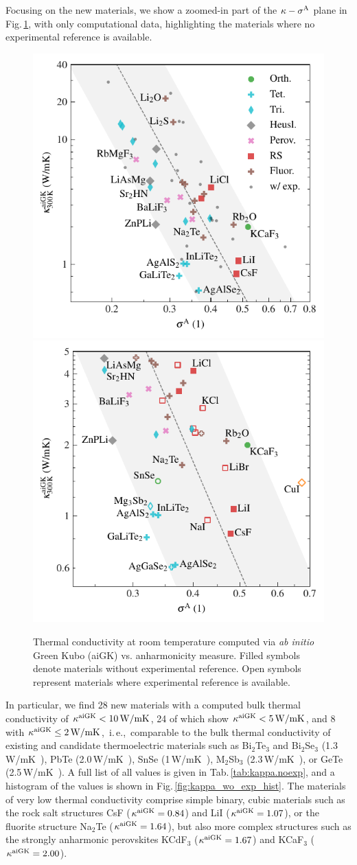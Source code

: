 Focusing on the new materials, we show a zoomed-in part of the $\kappa-\sigma^\mathrm{A}$ plane in Fig.\,\ref{fig:kappa_sigma}, with only computational data, highlighting the materials where no experimental reference is available.
%
\begin{figure}
	\includegraphics[width=.49\textwidth]{./data/plots/kappa_vs_sigma_trusted/kappa_vs_sigma_trusted.pdf}
	\hfill
	\includegraphics[width=.49\textwidth]{./data/plots/kappa_vs_sigma_trusted/kappa_vs_sigma_trusted_experiment_zoom.pdf}
	\caption{
	Thermal conductivity at room temperature computed via \emph{ab initio} Green Kubo (aiGK) vs. anharmonicity measure. Filled symbols denote materials without experimental reference. Open symbols represent materials where experimental reference is available.}
	\label{fig:kappa_sigma}
\end{figure}
%
In particular, we find 28 new materials with a computed bulk thermal conductivity of $\kappa^{\rm aiGK} < 10\,{\rm W/mK}$, 24 of which show $\kappa^{\rm aiGK} < 5\,{\rm W/mK}$, and 8 with $\kappa^{\rm aiGK} \leq 2\,{\rm W/mK}$,~i.\,e.,~comparable to the bulk thermal conductivity of existing and candidate thermoelectric materials such as Bi$_2$Te$_3$ and Bi$_2$Se$_3$ (1.3\,W/mK~\cite{Goldsmid1956,Satterthwaite1957}), PbTe (2.0\,W/mK~\cite{ElSharkawy1983}), SnSe (1\,W/mK~\cite{zhao2014,wei2016,sassi2014}), M$_2$Sb$_3$ (2.3\,W/mK~\cite{ahmadpour2007,pan2020}), or GeTe (2.5\,W/mK~\cite{Perumal2015}). A full list of all values is given in Tab.\,\ref{tab:kappa.noexp}, and a histogram of the values is shown in Fig.\,\ref{fig:kappa_wo_exp_hist}. The materials of very low thermal conductivity comprise simple binary, cubic materials such as the rock salt structures CsF ($\kappa^{\rm aiGK} = 0.84$) and LiI ($\kappa^{\rm aiGK} = 1.07$), or the fluorite structure Na$_2$Te ($\kappa^{\rm aiGK} = 1.64$), but also more complex structures such as the strongly anharmonic perovskites KCdF$_3$ ($\kappa^{\rm aiGK} = 1.67$) and KCaF$_3$ ($\kappa^{\rm aiGK} = 2.00$).


